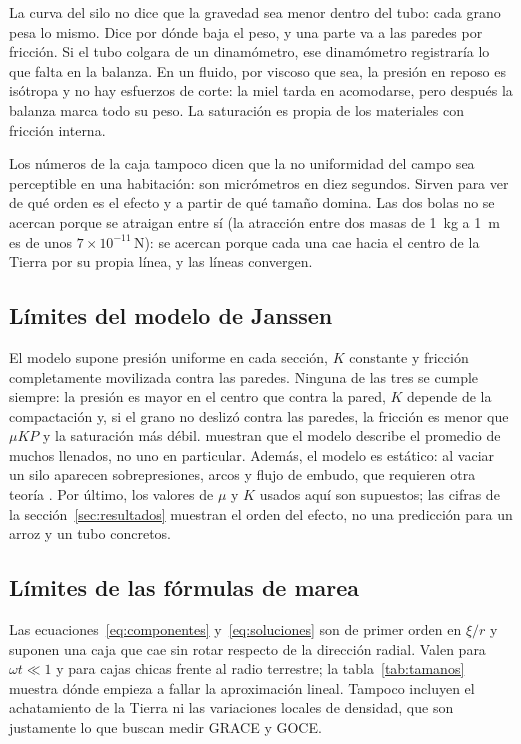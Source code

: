 \documentclass[11pt,a4paper]{article}
\newcommand{\unid}[1]{\,\mathrm{#1}}
\begin{document}
La curva del silo no dice que la gravedad sea menor dentro del tubo: cada grano pesa lo mismo. Dice por dónde baja el peso, y una parte va a las paredes por fricción. Si el tubo colgara de un dinamómetro, ese dinamómetro registraría lo que falta en la balanza. En un fluido, por viscoso que sea, la presión en reposo es isótropa y no hay esfuerzos de corte: la miel tarda en acomodarse, pero después la balanza marca todo su peso. La saturación es propia de los materiales con fricción interna.

Los números de la caja tampoco dicen que la no uniformidad del campo sea perceptible en una habitación: son micrómetros en diez segundos. Sirven para ver de qué orden es el efecto y a partir de qué tamaño domina. Las dos bolas no se acercan porque se atraigan entre sí (la atracción entre dos masas de 1~kg a 1~m es de unos $7\times10^{-11}\unid{N}$): se acercan porque cada una cae hacia el centro de la Tierra por su propia línea, y las líneas convergen.

\subsection{Límites del modelo de Janssen}

El modelo supone presión uniforme en cada sección, $K$ constante y fricción completamente movilizada contra las paredes. Ninguna de las tres se cumple siempre: la presión es mayor en el centro que contra la pared, $K$ depende de la compactación y, si el grano no deslizó contra las paredes, la fricción es menor que $\mu K P$ y la saturación más débil. \textcite{vanel1999} muestran que el modelo describe el promedio de muchos llenados, no uno en particular. Además, el modelo es estático: al vaciar un silo aparecen sobrepresiones, arcos y flujo de embudo, que requieren otra teoría \parencite{nedderman1992}. Por último, los valores de $\mu$ y $K$ usados aquí son supuestos; las cifras de la sección~\ref{sec:resultados} muestran el orden del efecto, no una predicción para un arroz y un tubo concretos.

\subsection{Límites de las fórmulas de marea}

Las ecuaciones~\eqref{eq:componentes} y~\eqref{eq:soluciones} son de primer orden en $\xi/r$ y suponen una caja que cae sin rotar respecto de la dirección radial. Valen para $\omega t \ll 1$ y para cajas chicas frente al radio terrestre; la tabla~\ref{tab:tamanos} muestra dónde empieza a fallar la aproximación lineal. Tampoco incluyen el achatamiento de la Tierra ni las variaciones locales de densidad, que son justamente lo que buscan medir GRACE y GOCE.
\end{document}
